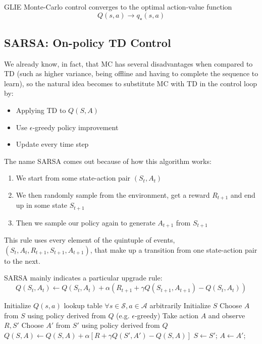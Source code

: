 \begin{theorem}
    GLIE Monte-Carlo control converges to the optimal action-value function $$Q(s,a) \to q_\star(s,a)$$
\end{theorem}

\subsection{SARSA: On-policy TD Control}
We already know, in fact, that MC has several disadvantages when compared to TD (such as higher variance, being offline and having to complete the sequence to learn), so the natural idea becomes to substitute MC with TD in the control loop by:
\begin{itemize}
    \item Applying TD to $Q(S,A)$
    \item Use $\epsilon$-greedy policy improvement
    \item Update every time step
\end{itemize}

The name SARSA comes out because of how this algorithm works:
\begin{enumerate}
    \item We start from some state-action pair $(S_t, A_t)$
    \item We then randomly sample from the environment, get a reward $R_{t+1}$ and end up in some state $S_{t+1}$
    \item Then we sample our policy again to generate $A_{t+1}$ from $S_{t+1}$
\end{enumerate}

This rule uses every element of the quintuple of events, $(S_t, A_t , R_{t+1} , S_{t+1} , A_{t+1} )$, that make up a transition from one state-action pair to the next. 

SARSA mainly indicates a particular upgrade rule:
\[
    Q(S_t,A_t) \gets Q(S_t,A_t) + \alpha (R_{t+1} + \gamma Q(S_{t+1},A_{t+1}) - Q(S_t,A_t))
\]

\begin{algorithm}
    \caption{SARSA for On-Policy Control}
    \begin{algorithmic}[1]
        \State Initialize $Q(s,a)$ lookup table $\forall s \in \mathcal{S}, a \in \mathcal{A}$ arbitrarily
            \State Initialize $S$
            \State Choose $A$ from $S$ using policy derived from $Q$ (e.g. $\epsilon$-greedy)
                \State Take action $A$ and observe $R,S'$
                \State Choose $A'$ from $S'$ using policy derived from $Q$
                \State $Q(S,A) \gets Q(S,A) + \alpha [R + \gamma Q(S',A') - Q(S,A)]$
                \State $S \gets S'$; $A \gets A'$;
            \EndFor
    \end{algorithmic}
\end{algorithm}

